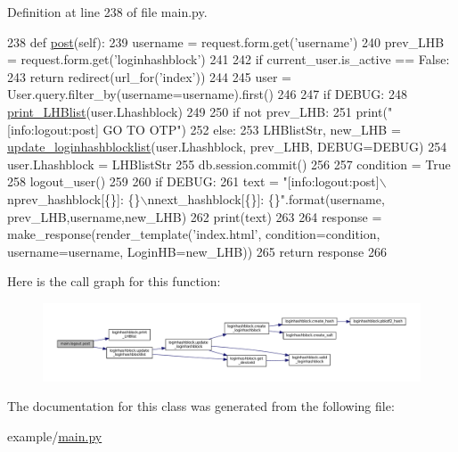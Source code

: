 Definition at line 238 of file main.\+py.


\begin{DoxyCode}
238     \textcolor{keyword}{def }\hyperlink{classmain_1_1logout_a726ef779e6bf4da8974eae3209276922}{post}(self):
239         username = request.form.get(\textcolor{stringliteral}{'username'})
240         prev\_LHB = request.form.get(\textcolor{stringliteral}{'loginhashblock'})
241 
242         \textcolor{keywordflow}{if} current\_user.is\_active == \textcolor{keyword}{False}:
243             \textcolor{keywordflow}{return} redirect(url\_for(\textcolor{stringliteral}{'index'}))
244 
245         user = User.query.filter\_by(username=username).first()
246 
247         \textcolor{keywordflow}{if} DEBUG:
248             \hyperlink{namespaceloginhashblock_a1096aa8494b9c5875decc029d8b40ea9}{print\_LHBlist}(user.Lhashblock)
249 
250         \textcolor{keywordflow}{if} \textcolor{keywordflow}{not} prev\_LHB:
251             print(\textcolor{stringliteral}{"[info:logout:post] GO TO OTP"})
252         \textcolor{keywordflow}{else}:
253             LHBlistStr, new\_LHB = \hyperlink{namespaceloginhashblock_a2bcc7ddd0fcc3788572dd77808cb624d}{update\_loginhashblocklist}(user.Lhashblock, 
      prev\_LHB, DEBUG=DEBUG)
254             user.Lhashblock = LHBlistStr
255             db.session.commit()
256 
257         condition = \textcolor{keyword}{True}
258         logout\_user()
259 
260         \textcolor{keywordflow}{if} DEBUG:
261             text = \textcolor{stringliteral}{"[info:logout:post]\(\backslash\)nprev\_hashblock[\{\}]: \{\}\(\backslash\)nnext\_hashblock[\{\}]: \{\}"}.format(username,
      prev\_LHB,username,new\_LHB)
262             print(text)
263 
264         response = make\_response(render\_template(\textcolor{stringliteral}{'index.html'}, condition=condition, username=username, 
      LoginHB=new\_LHB))
265         \textcolor{keywordflow}{return} response
266 
\end{DoxyCode}


Here is the call graph for this function\+:
\nopagebreak
\begin{figure}[H]
\begin{center}
\leavevmode
\includegraphics[width=350pt]{classmain_1_1logout_a726ef779e6bf4da8974eae3209276922_cgraph}
\end{center}
\end{figure}




The documentation for this class was generated from the following file\+:\begin{DoxyCompactItemize}
\item 
example/\hyperlink{main_8py}{main.\+py}\end{DoxyCompactItemize}
